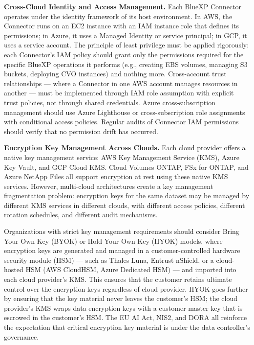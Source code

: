 \begin{securitybox}

\textbf{Cross-Cloud Identity and Access Management.}
Each BlueXP Connector operates under the identity framework of its host
environment. In AWS, the Connector runs on an EC2 instance with an IAM
instance role that defines its permissions; in Azure, it uses a Managed
Identity or service principal; in GCP, it uses a service account. The
principle of least privilege must be applied rigorously: each Connector's IAM
policy should grant only the permissions required for the specific BlueXP
operations it performs (e.g., creating EBS volumes, managing S3 buckets,
deploying CVO instances) and nothing more. Cross-account trust relationships
--- where a Connector in one AWS account manages resources in another --- must
be implemented through IAM role assumption with explicit trust policies, not
through shared credentials. Azure cross-subscription management should use
Azure Lighthouse or cross-subscription role assignments with conditional
access policies. Regular audits of Connector IAM permissions should verify
that no permission drift has occurred.

\textbf{Encryption Key Management Across Clouds.}
Each cloud provider offers a native key management service: AWS Key Management
Service (KMS), Azure Key Vault, and GCP Cloud KMS. Cloud Volumes ONTAP, FSx
for ONTAP, and Azure NetApp Files all support encryption at rest using these
native KMS services. However, multi-cloud architectures create a key
management fragmentation problem: encryption keys for the same dataset may be
managed by different KMS services in different clouds, with different access
policies, different rotation schedules, and different audit mechanisms.

Organizations with strict key management requirements should consider Bring
Your Own Key (BYOK) or Hold Your Own Key (HYOK) models, where encryption keys
are generated and managed in a customer-controlled hardware security module
(HSM) --- such as Thales Luna, Entrust nShield, or a cloud-hosted HSM (AWS
CloudHSM, Azure Dedicated HSM) --- and imported into each cloud provider's
KMS. This ensures that the customer retains ultimate control over the
encryption keys regardless of cloud provider. HYOK goes further by ensuring
that the key material never leaves the customer's HSM; the cloud provider's
KMS wraps data encryption keys with a customer master key that is escrowed in
the customer's HSM. The EU AI Act, NIS2, and DORA all reinforce the
expectation that critical encryption key material is under the data
controller's governance.


\end{securitybox}
